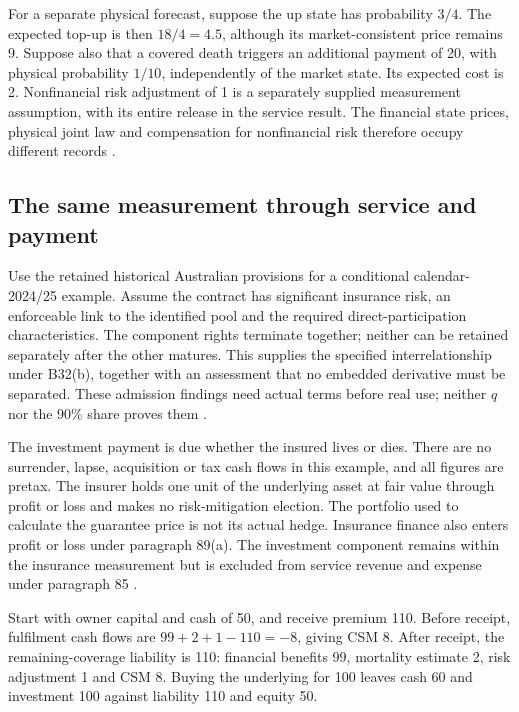 For a separate physical forecast, suppose the up state has probability
$3/4$. The expected top-up is then $18/4=4.5$, although its market-consistent
price remains 9. Suppose also that a covered death triggers an additional
payment of 20, with physical probability $1/10$, independently of the market
state. Its expected cost is 2. Nonfinancial risk adjustment of 1 is a
separately supplied measurement assumption, with its entire release in the
service result. The financial state prices, physical joint law and compensation
for nonfinancial risk therefore occupy different records
\citep[paragraphs 33, 37, 81 and B42--B49]{aasb17}.

\subsection{The same measurement through service and payment}

Use the retained historical Australian provisions for a conditional
calendar-2024/25 example. Assume the contract has significant insurance risk,
an enforceable link to the identified pool and the required direct-participation
characteristics. The component rights terminate together; neither can be
retained separately after the other matures. This supplies the specified
interrelationship under B32(b), together with an assessment that no embedded
derivative must be separated. These admission findings need actual terms
before real use; neither $q$ nor the 90\% share proves them
\citep[paragraphs 10--13, B17--B23, B31--B32 and B101--B108]{aasb17}.

The investment payment is due whether the insured lives or dies. There are
no surrender, lapse, acquisition or tax cash flows in this example, and all
figures are pretax. The insurer holds one unit of the underlying asset at
fair value through profit or loss and makes no risk-mitigation election.
The portfolio used to calculate the guarantee price is not its actual hedge.
Insurance finance also enters profit or loss under paragraph 89(a).
The investment component remains within the insurance measurement but is
excluded from service revenue and expense under paragraph 85
\citep[paragraphs 85, 89 and B115--B118]{aasb17}.

Start with owner capital and cash of 50, and receive premium 110.
Before receipt, fulfilment cash flows are $99+2+1-110=-8$, giving CSM 8.
After receipt, the remaining-coverage liability is 110: financial benefits 99,
mortality estimate 2, risk adjustment 1 and CSM 8. Buying the underlying
for 100 leaves cash 60 and investment 100 against liability 110 and equity 50.

